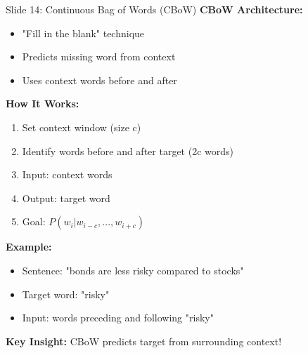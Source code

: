 \documentclass[8pt]{beamer}
\begin{document}
	\begin{frame}{Slide 14: Continuous Bag of Words (CBoW)}
		\fontsize{6.5}{7.5}\selectfont
		\textbf{CBoW Architecture:}
		\begin{itemize}
			\item "Fill in the blank" technique
			\item Predicts missing word from context
			\item Uses context words before and after
		\end{itemize}
		
		\vspace{0.1cm}
		\textbf{How It Works:}
		\begin{enumerate}
			\item Set context window (size c)
			\item Identify words before and after target (2c words)
			\item Input: context words
			\item Output: target word
			\item Goal: $P(w_i | w_{i-c}, ..., w_{i+c})$
		\end{enumerate}
		
		\vspace{0.1cm}
		\textbf{Example:}
		\begin{itemize}
			\item Sentence: "bonds are less risky compared to stocks"
			\item Target word: "risky"
			\item Input: words preceding and following "risky"
		\end{itemize}
		
		\textcolor{myblue}{\textbf{Key Insight:}} CBoW predicts target from surrounding context!
	\end{frame}
	
\end{document}
